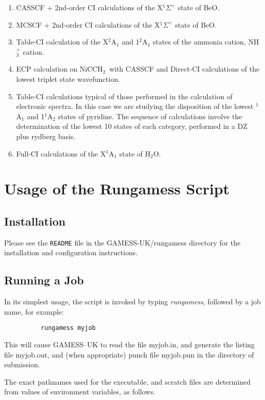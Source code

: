 \documentclass[11pt,fleqn]{article}
\newcommand{\water}{\mbox{H$_{2}$O}}
\newcommand{\nimeth}{\mbox{NiCCH$_{2}$}}
\begin{document}
\begin{enumerate}
\item CASSCF + 2nd-order CI calculations of the X$^{1}\Sigma^{+}$ 
state of BeO.
\item MCSCF + 2nd-order CI calculations of the X$^{1}\Sigma^{+}$ 
state of BeO.
\item  Table-CI calculation of the X$^{2}$A$_{1}$ and 1$^{2}$A$_{1}$ 
states of the ammonia cation, NH$_{3}^{+}$ cation.
\item  ECP calculation on \nimeth\, with CASSCF and Direct-CI
calculations of the lowest triplet state wavefunction.
\item  Table-CI calculations typical of those
performed in the calculation of electronic spectra.
In this case we are studying the disposition of the lowest
$^{1}$A$_{1}$ and 1$^{1}$A$_{2}$ states of pyridine.
The sequence of calculations involve the determination of the
lowest 10 states of each category, performed in a DZ plus rydberg
basis.
\item Full-CI calculations of  the X$^{1}$A$_{1}$ state of \water.
\end{enumerate}

\section[Usage of the Rungamess Script]{Usage of the Rungamess Script}

\subsection[Installation]{Installation}
Please see the {\tt README} file in the GAMESS-UK/rungamess directory 
for the installation and configuration instructions.

\subsection[Running a Job]{Running a Job}
In its simplest usage, the script is invoked by typing {\em rungamess}, followed
by a job name, for example:

{
\footnotesize
\begin{verbatim}
          rungamess myjob
\end{verbatim}
}
This will cause GAMESS--UK to read the file myjob.in, and generate
the listing file myjob.out, and (when appropriate) punch file myjob.pun
in the directory of submission.

The exact pathnames used for the executable, and scratch files are determined
from values of environment variables, as follows.
\end{document}
